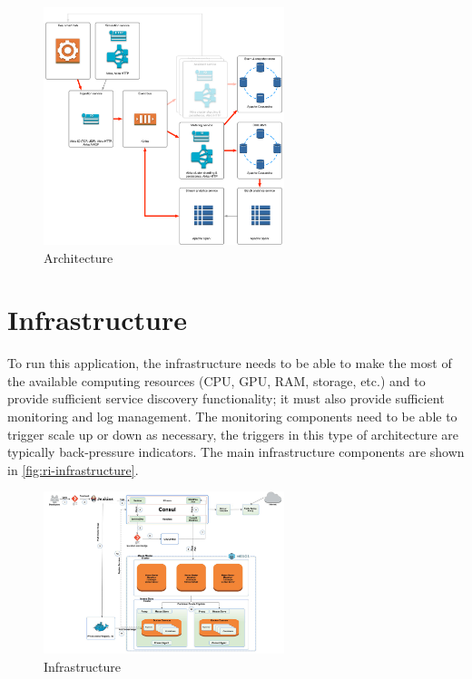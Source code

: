 \documentclass[a4paper, 10 pt, conference]{IEEEtran}
\begin{document}
\begin{figure}[h]
	\begin{center}
		\caption{Architecture}
		\label{fig:ri-architecture}
		\includegraphics[width=7cm,keepaspectratio]{ri-arch.png}
	\end{center}
\end{figure}

\section{Infrastructure}

To run this application, the infrastructure needs to be able to make the most of the available computing resources (CPU, GPU, RAM, storage, etc.) and to provide sufficient service discovery functionality; it must also provide sufficient monitoring and log management. The monitoring components need to be able to trigger scale up or down as necessary, the triggers in this type of architecture are typically back-pressure indicators. The main infrastructure components are shown in \autoref{fig:ri-infrastructure}.

\begin{figure}[h]
	\begin{center}
		\caption{Infrastructure}
		\label{fig:ri-infrastructure}
		\includegraphics[width=7cm,keepaspectratio]{ri-infrastructure.jpg}
	\end{center}
\end{figure}
\end{document}
